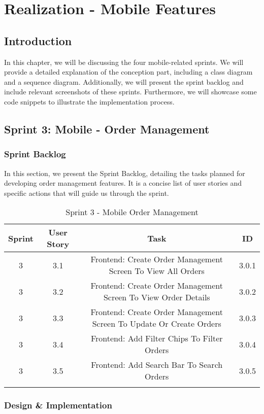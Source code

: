 \chapter{Realization - Mobile Features}
\setcounter{minitocdepth}{1}
\minitoc
\newpage

\section{Introduction}
In this chapter, we will be discussing the four mobile-related sprints. We will provide a detailed explanation of the conception part, including a class diagram and a sequence diagram. Additionally, we will present the sprint backlog and include relevant screenshots of these sprints. Furthermore, we will showcase some code snippets to illustrate the implementation process.

\section{Sprint 3: Mobile - Order Management}

\subsection{Sprint Backlog}
In this section, we present the Sprint Backlog, detailing the tasks planned for developing order management features. It is a concise list of user stories and specific actions that will guide us through the sprint.

\setlength{\LTleft}{0pt}
\begin{longtable}{|c|c|c|c|}
\hline
\textbf{Sprint} & \textbf{User Story} & \textbf{Task} & \textbf{ID} \\
\hline
3 & 3.1 & Frontend: Create Order Management Screen To View All Orders & 3.0.1 \\
\hline
3 & 3.2 & Frontend: Create Order Management Screen To View Order Details & 3.0.2 \\
\hline
3 & 3.3 & Frontend: Create Order Management Screen To Update Or Create Orders & 3.0.3 \\
\hline
3 & 3.4 & Frontend: Add Filter Chips To Filter Orders & 3.0.4 \\
\hline
3 & 3.5 & Frontend: Add Search Bar To Search Orders & 3.0.5 \\
\hline
\caption{Sprint 3 - Mobile Order Management}
\label{tab:sprint3_backlog} 
\end{longtable}

\subsection{Design \& Implementation}

